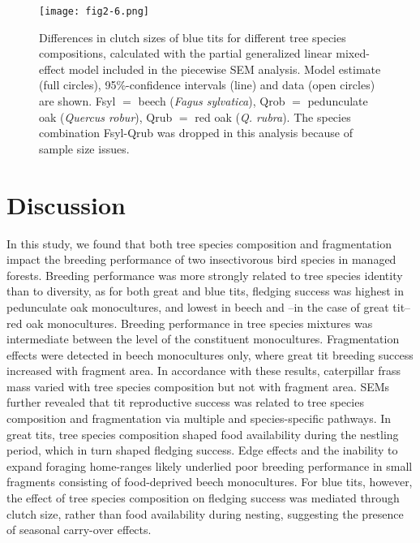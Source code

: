 \documentclass[10pt, twoside]{book} %
\begin{document}
\begin{figure}[h!]
	\begin{center}
		\texttt{[image: fig2-6.png]}
	\end{center}
	\caption{Differences in clutch sizes of blue tits for different tree species compositions, calculated with the partial generalized linear mixed-effect model included in the piecewise SEM analysis. Model estimate (full circles), 95\%-confidence intervals (line) and data (open circles) are shown. Fsyl $=$ beech (\textit{Fagus sylvatica}), Qrob $=$ pedunculate oak (\textit{Quercus robur}), Qrub $=$ red oak (\textit{Q. rubra}).  The species combination Fsyl-Qrub was dropped in this analysis because of sample size issues. \label{fig2-6}}
\end{figure}		

\clearpage
	\section{Discussion}
	
	In this study, we found that both tree species composition and fragmentation impact the breeding performance of two insectivorous bird species in managed forests. Breeding performance was more strongly related to tree species identity than to diversity, as for both great and blue tits, fledging success was highest in pedunculate oak monocultures, and lowest in beech and --in the case of great tit-- red oak monocultures. Breeding performance in tree species mixtures was intermediate between the level of the constituent monocultures. Fragmentation effects were detected in beech monocultures only, where great tit breeding success increased with fragment area. In accordance with these results, caterpillar frass mass varied with tree species composition but not with fragment area. SEMs further revealed that tit reproductive success was related to tree species composition and fragmentation via multiple and species-specific pathways. In great tits, tree species composition shaped food availability during the nestling period, which in turn shaped fledging success. Edge effects and the inability to expand foraging home-ranges likely underlied poor breeding performance in small fragments consisting of food-deprived beech monocultures. For blue tits, however, the effect of tree species composition on fledging success was mediated through clutch size, rather than food availability during nesting, suggesting the presence of seasonal carry-over effects.\\
	
\end{document}
